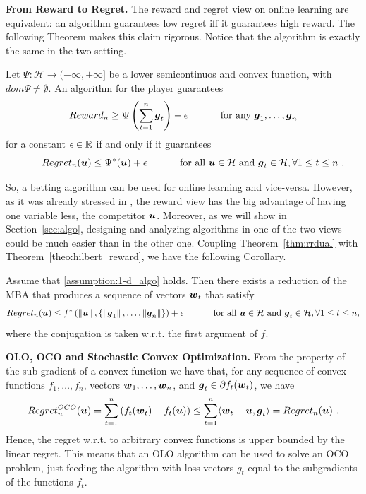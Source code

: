 \vspace{0.2cm}\noindent\textbf{From Reward to Regret.}
The reward and regret view on online learning are equivalent: an algorithm guarantees low regret iff it guarantees high reward. The following Theorem makes this claim rigorous. Notice that the algorithm is exactly the same in the two setting.
\begin{theorem}
  \label{thm:rrdual}
  Let $\Psi:\mathcal{H} \rightarrow (-\infty, +\infty]$ be a lower semicontinuos and convex function, with $dom \Psi \neq \emptyset$. An
  algorithm for the player guarantees
  \[
  Reward_n \geq \Psi\left(\sum_{t=1}^n \boldsymbol{g}_t\right) - \epsilon \quad \quad \quad \textnormal{ for any } \boldsymbol{g}_1, \dots, \boldsymbol{g}_n
  \]
  for a constant $\epsilon \in \mathbb{R}$ if and only if it
  guarantees
  \begin{equation}\label{eq:regb}
  \qquad Regret_n(\boldsymbol{u}) \leq \Psi^*(\boldsymbol{u}) + \epsilon \quad \quad \quad \textnormal{ for all } \boldsymbol{u} \in \mathcal{H} \textnormal{ and } \boldsymbol{g}_t \in \mathcal{H}, \forall 1\leq t\leq n~.
  \end{equation}
\end{theorem}
So, a betting algorithm can be used for online learning and vice-versa. However, as it was already stressed in \citet{McMahanO14}, the reward view has the big advantage of having one variable less, the competitor $\boldsymbol{u}$.
Moreover, as we will show in Section~\ref{sec:algo}, designing and analyzing algorithms in one of the two views could be much easier than in the other one.
Coupling Theorem~\ref{thm:rrdual} with Theorem~\ref{theo:hilbert_reward}, we have the following Corollary.
\begin{cor}
\label{theo:hilbert_regret}
Assume that \ref{assumption:1-d_algo} holds. Then there exists a reduction of the \ac{MBA} that produces a sequence of vectors $\boldsymbol{w}_t$ that satisfy
\[
Regret_n(\boldsymbol{u}) \leq f^*\left( \left\|{\boldsymbol{u}}\right\|, \left\{\left\|{\boldsymbol{g}_1}\right\|, \ldots, \left\|{\boldsymbol{g}_n}\right\|\right\}\right)+\epsilon \quad \quad \quad \textnormal{ for all } \boldsymbol{u} \in \mathcal{H} \textnormal{ and } \boldsymbol{g}_t \in \mathcal{H}, \forall 1\leq t\leq n,
\]
where the conjugation is taken w.r.t. the first argument of $f$.
\end{cor}

\vspace{0.2cm}\noindent\textbf{\ac{OLO}, \ac{OCO} and Stochastic Convex Optimization.}
From the property of the sub-gradient of a convex function we have that, for any sequence of convex functions $f_1, \ldots, f_n$, vectors $\boldsymbol{w}_1,\ldots, \boldsymbol{w}_n$, and $\boldsymbol{g}_t \in \partial f_t(\boldsymbol{w}_t)$, we have
\[
Regret^{OCO}_n(\boldsymbol{u}) = \sum_{t=1}^n \left( f_t(\boldsymbol{w}_t) -f_t(\boldsymbol{u})\right) \leq \sum_{t=1}^n \langle \boldsymbol{w}_t-\boldsymbol{u}, \boldsymbol{g}_t\rangle = Regret_n(\boldsymbol{u})~.
\]
Hence, the regret w.r.t. to arbitrary convex functions is upper bounded by the linear regret. This means that an \ac{OLO} algorithm can be used to solve an \ac{OCO} problem, just feeding the algorithm with loss vectors $g_t$ equal to the subgradients of the functions $f_t$.

